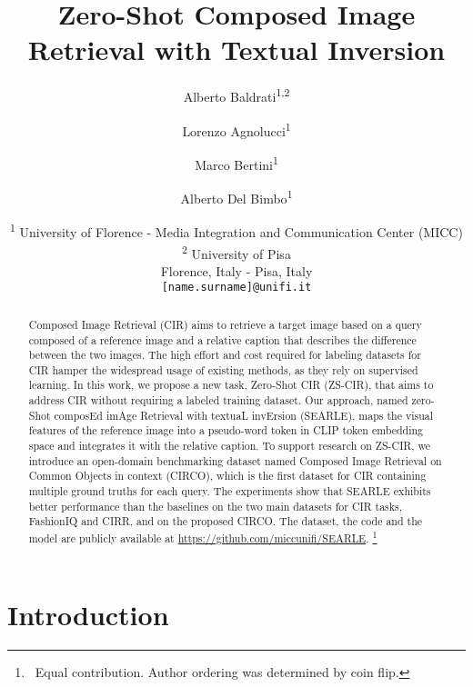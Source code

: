 \documentclass[10pt,twocolumn,letterpaper]{article}
\newcommand{\method}{SEARLE\xspace}
\newcommand\blfootnote[1]{\begingroup
  \renewcommand\thefootnote{}\footnote{#1}\addtocounter{footnote}{-1}\endgroup
}
\begin{document}
\title{Zero-Shot Composed Image Retrieval with Textual Inversion}

\author{\textsuperscript{}Alberto Baldrati\textsuperscript{1,2} \and \textsuperscript{}Lorenzo Agnolucci\textsuperscript{1} \and  Marco Bertini\textsuperscript{1} \and Alberto Del Bimbo\textsuperscript{1} \and
\textsuperscript{1} University of Florence - Media Integration and Communication Center (MICC) \\  \textsuperscript{2} University of Pisa \\ 
Florence, Italy - Pisa, Italy\\
{\tt\small [name.surname]@unifi.it}
}

\maketitle


\begin{abstract}
Composed Image Retrieval (CIR) aims to retrieve a target image based on a query composed of a reference image and a relative caption that describes the difference between the two images. The high effort and cost required for labeling datasets for CIR hamper the widespread usage of existing methods, as they rely on supervised learning. In this work, we propose a new task, Zero-Shot CIR (ZS-CIR), that aims to address CIR without requiring a labeled training dataset. Our approach, named zero-Shot composEd imAge Retrieval with textuaL invErsion (\method), maps the visual features of the reference image into a pseudo-word token in CLIP token embedding space and integrates it with the relative caption. To support research on ZS-CIR, we introduce an open-domain benchmarking dataset named Composed Image Retrieval on Common Objects in context (CIRCO), which is the first dataset for CIR containing multiple ground truths for each query. The experiments show that \method exhibits better performance than the baselines on the two main datasets for CIR tasks, FashionIQ and CIRR, and on the proposed CIRCO. The dataset, the code and the model are publicly available at \small{\href{https://github.com/miccunifi/SEARLE}{\url{https://github.com/miccunifi/SEARLE}}}. \blfootnote{\textsuperscript{}~Equal contribution. Author ordering was determined by coin flip.} 
\end{abstract}

\section{Introduction}
\end{document}
